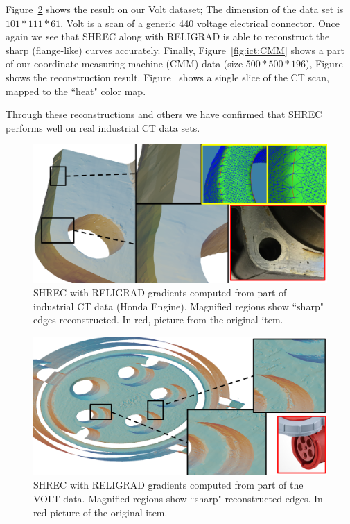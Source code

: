 Figure~\ref{fig:ict:volt} shows the result on our Volt dataset; The dimension of the data set is $101*111*61$. Volt is a scan of a generic 440 voltage electrical connector. Once again we see that SHREC along with RELIGRAD is able to reconstruct the sharp (flange-like) curves accurately. Finally, Figure~\ref{fig:ict:CMM} shows a part of our coordinate measuring machine (CMM) data (size $500*500*196$), Figure~\protect{} shows the reconstruction result. Figure~\protect{} shows a single slice of the CT scan, mapped to the ``heat" color map. 

Through these reconstructions and others we have confirmed that SHREC performs well on real industrial CT data sets. 

\begin{figure}\centering
	\includegraphics[width=\linewidth]{images/ictsetA_2.eps}
	\caption{SHREC with RELIGRAD gradients computed from part of industrial CT data (Honda Engine). Magnified regions show ``sharp" edges reconstructed. In red, picture from the original item.}
	\label{fig:ict:hondaEng}
\end{figure}

\begin{figure}\centering
	\includegraphics[width=\linewidth]{images/volt.eps}
	\caption{SHREC with RELIGRAD gradients computed from part of the VOLT data. Magnified regions show ``sharp" reconstructed edges. In red picture of the original item.}
	\label{fig:ict:volt}
\end{figure}

